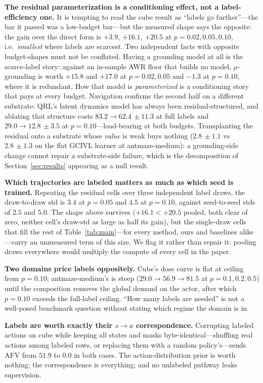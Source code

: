 \documentclass{article}
\newcommand{\pmm}[2]{#1{\scriptstyle\,\pm #2}}
\theoremstyle{plain}
\theoremstyle{definition}
\begin{document}
\textbf{The residual parameterization is a conditioning effect, not a label-efficiency one.} It is tempting to read the cube result as ``labels go further''---the bar it passed was a low-budget bar---but the measured shape says the opposite: the gain over the direct form is $+3.9$, $+16.1$, $+20.5$ at $p{=}0.02,0.05,0.10$, i.e.\ \emph{smallest} where labels are scarcest. Two independent facts with opposite budget-shapes must not be conflated. Having a grounding model at all is the scarce-label story: against an in-sample AWR floor that builds no model, $\mu$-grounding is worth $+15.8$ and $+17.0$ at $p{=}0.02,0.05$ and $-1.3$ at $p{=}0.10$, where it is redundant. How that model is \emph{parameterized} is a conditioning story that pays at every budget. Navigation confirms the second half on a different substrate: QRL's latent dynamics model has always been residual-structured, and ablating that structure costs $83.2\rightarrow\pmm{62.4}{11.3}$ at full labels and $29.0\rightarrow\pmm{12.8}{3.5}$ at $p{=}0.10$---load-bearing at both budgets. Transplanting the residual onto a substrate whose \emph{value} is weak buys nothing ($\pmm{2.8}{1.1}$ vs $\pmm{2.8}{1.3}$ on the flat GCIVL learner at antmaze-medium): a grounding-side change cannot repair a substrate-side failure, which is the decomposition of Section~\ref{sec:results} appearing as a null result.

\textbf{Which trajectories are labeled matters as much as which seed is trained.} Repeating the residual cells over three independent label draws, the draw-to-draw std is $3.4$ at $p{=}0.05$ and $4.5$ at $p{=}0.10$, against seed-to-seed stds of $2.5$ and $5.0$. The shape above survives ($+16.1<+20.5$ pooled, both clear of zero, neither cell's draw-std as large as half its gain), but the single-draw cells that fill the rest of Table~\ref{tab:main}---for every method, ours and baselines alike---carry an unmeasured term of this size. We flag it rather than repair it: pooling draws everywhere would multiply the compute of every cell in the paper.

\textbf{Two domains price labels oppositely.} Cube's dose curve is flat at ceiling from $p{=}0.10$; antmaze-medium's is steep ($29.0\rightarrow 56.9\rightarrow 81.5$ at $p{=}0.1,0.2,0.5$) until the composition removes the global demand on the actor, after which $p{=}0.10$ exceeds the full-label ceiling. ``How many labels are needed'' is not a well-posed benchmark question without stating which regime the domain is in.

\textbf{Labels are worth exactly their $s\!\to\!a$ correspondence.} Corrupting labeled actions on cube while keeping all states and masks byte-identical---shuffling real actions among labeled rows, or replacing them with a random policy's---sends AFV from $51.9$ to $0.0$ in both cases. The action-distribution prior is worth nothing; the correspondence is everything; and no unlabeled pathway leaks supervision.
\end{document}
